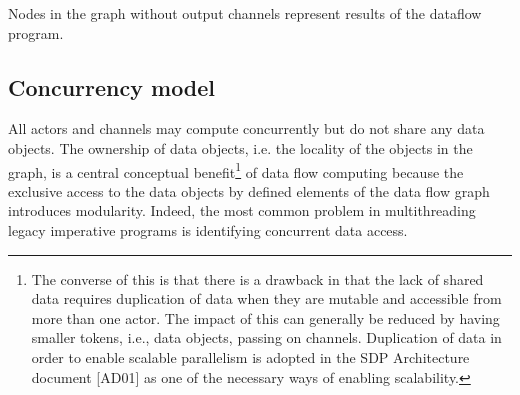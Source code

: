 \documentclass[11pt,a4paper]{article}
\begin{document}
Nodes in the graph without output channels represent results of the dataflow program.

\subsection{Concurrency model}
 
All actors and channels may compute concurrently but do not share any
data objects. The ownership of data objects, i.e. the locality of the
objects in the graph, is a central conceptual benefit\footnote{The
  converse of this is that there is a drawback in that the lack of
  shared data requires duplication of data when they are mutable and
  accessible from more than one actor. The impact of this can
  generally be reduced by having smaller tokens, i.e., data objects,
  passing on channels. Duplication of data in order to enable scalable
  parallelism is adopted in the SDP Architecture document [AD01] as
  one of the necessary ways of enabling scalability.} of data flow
computing because the exclusive access to the data objects by defined
elements of the data flow graph introduces modularity. Indeed, the
most common problem in multithreading legacy imperative programs is
identifying concurrent data access.
\end{document}

